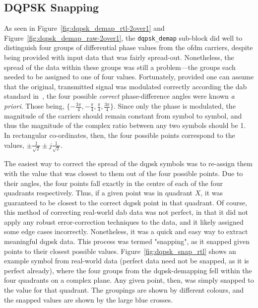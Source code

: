 \documentclass[class=report,11pt,crop=false]{standalone}
\begin{document}
\subsection{DQPSK Snapping \label{subsect:dab-proc_dqpsk-snap}}
As seen in Figure~\ref{fig:dqpsk_demap_rtl-2over1} and Figure~\ref{fig:dqpsk_demap_raw-2over1}, the \texttt{dqpsk\_demap} sub-block did well to distinguish four groups of differential phase values from the \gls{ofdm} carriers, despite being provided with input data that was fairly spread-out. Nonetheless, the spread of the data within these groups was still a problem---the groups each needed to be assigned to one of four values. Fortunately, provided one can assume that the original, transmitted signal was modulated correctly according the \gls{dab} standard in~\cite{dabstandard}, the four possible \emph{correct} phase-difference angles were known \emph{a priori}. Those being, \(\{-\frac{3\pi}{4}, -\frac{\pi}{4},\frac{\pi}{4}, \frac{3\pi}{4}\}\). Since only the phase is modulated, the magnitude of the carriers should remain constant from symbol to symbol, and thus the magnitude of the complex ratio between any two symbols should be 1. In rectangular co-ordinates, then, the four possible points correspond to the values, \(\pm \frac{1}{\sqrt{2}} \pm j\frac{1}{\sqrt{2}}\).

The easiest way to correct the spread of the \gls{dqpsk} symbols was to re-assign them with the value that was closest to them out of the four possible points. Due to their angles, the four points fall exactly in the centre of each of the four quadrants respectively. Thus, if a given point was in quadrant \(X\), it was guaranteed to be closest to the correct \gls{dqpsk} point in that quadrant. Of course, this method of correcting real-world \gls{dab} data was not perfect, in that it did not apply any robust error-correction techniques to the data, and it likely assigned some edge cases incorrectly. Nonetheless, it was a quick and easy way to extract meaningful \gls{dqpsk} data. This process was termed "snapping", as it snapped given points to their closest possible values. Figure~\ref{fig:dqpsk_snap_rtl} shows an example symbol from real-world data (perfect data need not be snapped, as it is perfect already), where the four groups from the \gls{dqpsk}-demapping fell within the four quadrants on a complex plane. Any given point, then, was simply snapped to the value for that quadrant. The groupings are shown by different colours, and the snapped values are shown by the large blue crosses.
\end{document}
